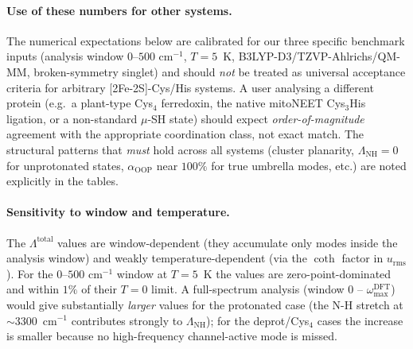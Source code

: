 \documentclass[10pt,a4paper,twoside]{article}
\newcommand{\urms}{u_{\mathrm{rms}}}
\newcommand{\OOP}{\mathrm{OOP}}
\begin{document}
\paragraph{Use of these numbers for other systems.}
The numerical expectations below are calibrated for our three
specific benchmark inputs (analysis window $0\text{--}500$
cm$^{-1}$, $T = 5$~K, B3LYP-D3/TZVP-Ahlrichs/QM-MM, broken-symmetry
singlet) and should \emph{not} be treated as universal acceptance
criteria for arbitrary [2Fe-2S]-Cys/His systems. A user analysing
a different protein (e.g.\ a plant-type Cys$_4$ ferredoxin, the
native mitoNEET Cys$_3$His ligation, or a non-standard $\mu$-SH
state) should expect \emph{order-of-magnitude} agreement with the
appropriate coordination class, not exact match. The structural
patterns that \emph{must} hold across all systems (cluster
planarity, $\Lambda_\text{NH} = 0$ for unprotonated states,
$\alpha_{\OOP}$ near $100\%$ for true umbrella modes, etc.) are
noted explicitly in the tables.

\paragraph{Sensitivity to window and temperature.}
The $\Lambda^\text{total}$ values are window-dependent (they
accumulate only modes inside the analysis window) and weakly
temperature-dependent (via the $\coth$ factor in $\urms$). For
the $0$--$500$ cm$^{-1}$ window at $T = 5$~K the values are
zero-point-dominated and within $1\%$ of their $T = 0$ limit. A
full-spectrum analysis (window $0$ -- $\omega_\text{max}^\text{DFT}$)
would give substantially \emph{larger} values for the protonated
case (the N-H stretch at $\sim 3300$~cm$^{-1}$ contributes
strongly to $\Lambda_\text{NH}$); for the deprot/Cys$_4$ cases
the increase is smaller because no high-frequency channel-active
mode is missed.
\end{document}
